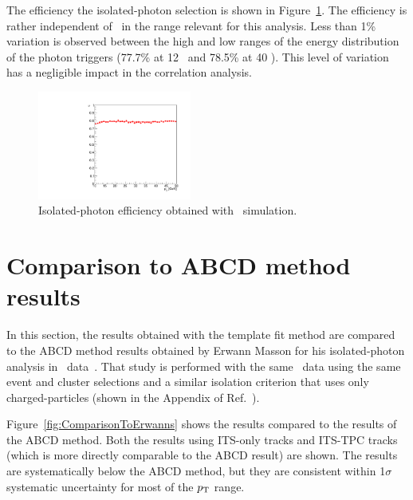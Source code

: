 The efficiency the isolated-photon selection is shown in Figure~\ref{fig:photonEff_pPb}. The efficiency is rather independent of \pt~in the range relevant for this analysis. Less than 1\% variation is observed between the high and low ranges of the energy distribution of the photon triggers (77.7\% at 12 \GeVc~and 78.5\% at 40 \GeVc). This level of variation has a negligible impact in the correlation analysis. 
\begin{figure}
\centering
\includegraphics[width=0.45\textwidth]{Checks_Systematics/Efficiency_photon_pPb}
\caption{Isolated-photon efficiency obtained with \pPb~simulation.}
\label{fig:photonEff_pPb}
\end{figure}

\section{Comparison to ABCD method results}
\label{sec:comparisontoABCD}
In this section, the results obtained with the template fit method are compared to the ABCD method results obtained by Erwann Masson for his isolated-photon analysis in \pPb~data~\cite{Erwann}. That study is performed with the same \pPb~data using the same event and cluster selections and a similar isolation criterion that uses only charged-particles (shown in the Appendix of Ref.~\cite{Erwann}).

Figure~\ref{fig:ComparisonToErwanns} shows the results compared to the results of the ABCD method. Both the results using ITS-only tracks and ITS-TPC tracks (which is more directly comparable to the ABCD result) are shown. The results are systematically below the ABCD method, but they are consistent within 1$\sigma$ systematic uncertainty for most of the $p_{\mathrm{T}}$ range. 

